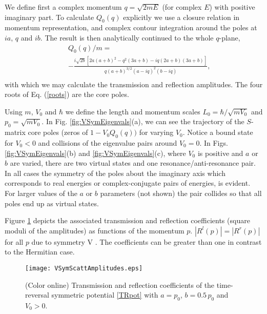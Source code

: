 We define first a complex momentum $q=\sqrt{2 m E}$ (for complex $E$) with positive imaginary part.
To calculate $Q_{0}(q)$ explicitly we use a closure relation in momentum representation, and
complex contour integration around the poles at $ia$, $q$ and $ib$.
The result is then analytically continued to the whole $q$-plane,
%
\begin{eqnarray}
&&Q_{0}(q)/m=
\nonumber\\
&&-\frac{i \sqrt{2b} \left[2 a (a+b)^2-q^2 (3 a+b)-i q (2 a+b) (3 a+b)\right]}{q (a+b)^{3/2} (a-i q)^2 (b-i q)},
\nonumber\\
\label{eq:ResolvantVSymm}
\end{eqnarray}
%
with which we may calculate the transmission and reflection amplitudes.
The four roots of Eq. (\ref{roots}) are the core poles.

Using $m$, $V_0$ and $\hbar$ we define the length and momentum scales $L_0 = \hbar/\sqrt{mV_0}$ and $p_0 = \sqrt{mV_0}$. In Fig. \ref{fig:VSymEigenvals}(a), we can see the trajectory of the $S$-matrix core poles (zeros
of $1-V_0Q_0(q))$ for varying $V_0$. Notice a bound state for $V_0<0$ and collisions of the eigenvalue pairs around $V_0 = 0$. In Figs. \ref{fig:VSymEigenvals}(b) and \ref{fig:VSymEigenvals}(c), where $V_0$ is positive and $a$ or $b$ are varied,
there are two virtual states and one resonance/anti-resonance pair. In all cases the symmetry of the poles about the imaginary axis
which corresponds to real energies or complex-conjugate pairs of energies, is evident. For larger values of the $a$ or $b$ parameters
(not shown)
the pair collides so that all poles end up as virtual states.

Figure \ref{fig:VSymScattAmplitudes} depicts the associated transmission and reflection coefficients (square moduli of the amplitudes) as functions of the momentum $p$. $|R^l(p)|=|R^r(p)|$ for all $p$ due to symmetry V \cite{Ruschhaupt2017}.
The coefficients can be greater than one in contrast to the Hermitian case.

\begin{figure}
    \begin{center}
    \texttt{[image: VSymScattAmplitudes.eps]}
    \end{center}
    \caption{(Color online) Transmission and reflection coefficients of the time-reversal symmetric potential \eqref{TRpot} with $a=p_0$, $b= 0.5\, p_0$ and $V_0>0$.}
    \label{fig:VSymScattAmplitudes}
\end{figure}

